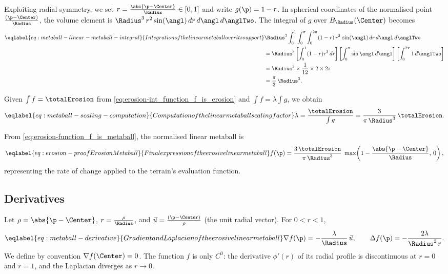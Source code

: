 Exploiting radial symmetry, we set $r = \frac{\abs{\p - \Center}}{\Radius} \in [0,1]$ and write $g(\p) = 1 - r$.  
In spherical coordinates of the normalised point $\frac{(\p - \Center)}{\Radius}$, the volume element is $\Radius^3\, r^2 \sin(\angl)\, dr\, d\angl\, d\anglTwo$.  
The integral of $g$ over $B_{\Radius}(\Center)$ becomes
\begin{align}
    \eqlabel{eq:metaball-linear-metaball-integral}{Integration of the linear metaball over its support}
    &\Radius^3 \int_{0}^{1} \int_{0}^{\pi} \int_{0}^{2\pi} (1 - r) \, r^2 \, \sin(\angl)\, dr\, d\angl\, d\anglTwo \nonumber \\
    &= \Radius^3 \left[ \int_{0}^{1} (1 - r) r^2 \, dr \right]
       \left[ \int_{0}^{\pi} \sin{\angl} \, d\angl \right]
       \left[ \int_{0}^{2\pi} 1 \, d\anglTwo \right] \nonumber \\
    &= \Radius^3 \times \frac{1}{12} \times 2 \times 2\pi \nonumber \\
    &= \frac{\pi}{3} \, \Radius^3.
\end{align}

Given $\int f = \totalErosion$ from \cref{eq:erosion-int_function_f_is_erosion} and $\int f = \lambda \int g$, we obtain
\begin{align}
    \eqlabel{eq:metaball-scaling-computation}{Computation of the linear metaball scaling factor}
    \lambda = \frac{\totalErosion}{\int g} = \frac{3}{\pi\,\Radius^3}\,\totalErosion.
\end{align}

From \eqref{eq:erosion-function_f_is_metaball}, the normalised linear metaball is
\begin{align} 
    \eqlabel{eq:erosion-proofErosionMetaball}{Final expression of the erosive linear metaball}
    f(\p) = \frac{3 \,\totalErosion}{\pi\,\Radius^3} \;
    \max\!\left(1 - \frac{\abs{\p - \Center}}{\Radius},\,0\right),
\end{align}
representing the rate of change applied to the terrain's evaluation function.

\subsection*{Derivatives}
Let $\rho = \abs{\p - \Center}$, $r=\frac{\rho}{\Radius}$, and $\vec{u} = \frac{(\p - \Center)}{\rho}$ (the unit radial vector).  
For $0 < r < 1$,
\begin{align}
    \eqlabel{eq:metaball-derivative}{Gradient and Laplacian of the erosive linear metaball}
    \nabla f(\p) = -\frac{\lambda}{\Radius} \, \vec{u},
    \qquad
    \Delta f(\p) = -\frac{2\lambda}{\Radius^2\, r}.
\end{align}
We define by convention $\nabla f(\Center) = 0$.  
The function $f$ is only $C^0$: the derivative $\phi'(r)$ of its radial profile is discontinuous at $r=0$ and $r=1$, and the Laplacian diverges as $r \to 0$.

